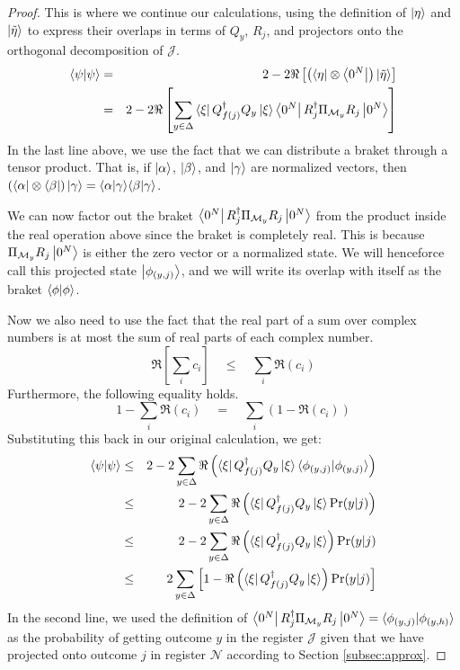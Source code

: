 \begin{proof}
This is where we continue our calculations, using the definition of $\left\vert{\eta}\right\rangle$
and $\left\vert{\tilde{\eta}}\right\rangle$ to express their overlaps in terms of $Q_y$,
$R_j$, and projectors onto the orthogonal decomposition of $\mathcal{J}$.
%
\begin{eqnarray}
\langle \psi|\psi \rangle & = & 2 - 2\Re\left[ \left(\left\langle{\eta}\right\vert \otimes \left\langle{0^N}\right\vert\right) \left\vert{\tilde{\eta}}\right\rangle \right] \\
                    & = & 2 - 2\Re\left[ \sum_{y \in \Delta} \left\langle{\xi}\right\vert Q_{f(j)}^{\dagger}Q_y \left\vert{\xi}\right\rangle
                                                             \left\langle{0^N}\right\vert R_j^{\dagger}\Pi_{\mathcal{M}_y}R_j\left\vert{0^N}\right\rangle \right] \label{eqn:sym-real}
\end{eqnarray}
%
In the last line above, we use the fact that we can distribute a braket
through a tensor product. That is, if $\left\vert{\alpha}\right\rangle$, $\left\vert{\beta}\right\rangle$, and
$\left\vert{\gamma}\right\rangle$ are normalized vectors, then
$\left( \left\langle{\alpha}\right\vert \otimes \left\langle{\beta}\right\vert\right) \left\vert{\gamma}\right\rangle = 
 \langle \alpha|\gamma \rangle\langle \beta|\gamma \rangle$.
 
We can now factor out the braket
$\left\langle{0^N}\right\vert R_j^{\dagger}\Pi_{\mathcal{M}_y}R_j\left\vert{0^N}\right\rangle$ from the product
inside the real operation above since the braket is completely real. This is
because $\Pi_{\mathcal{M}_y}R_j \left\vert{0^N}\right\rangle$ is either the zero vector or
a normalized state. We will henceforce call this projected state
$\left\vert{\phi_{(y,j)}}\right\rangle$, and we will write its overlap with itself
as the braket $\langle \phi|\phi \rangle$.

Now we also need to use the fact that the real part of a sum over complex
numbers is at most the sum of real parts of each complex number.
%
\begin{equation}
\Re\left[ \sum_{i} c_i \right] \quad \le \quad \sum_{i} \Re( c_i )
\end{equation}
%
Furthermore, the following equality holds.
%
\begin{equation}
1 - \sum_{i} \Re(c_i) \quad = \quad \sum_{i} \left(1 - \Re(c_i) \right)
\end{equation}
%
Substituting this
back in our original calculation, we get:
%
\begin{eqnarray}
\langle \psi|\psi \rangle & \le & 2 - 2\sum_{y \in \Delta} \Re\left(
  \left\langle{\xi}\right\vert Q_{f(j)}^{\dagger}Q_y \left\vert{\xi}\right\rangle
  \langle \phi_{(y,j)}|\phi_{(y,j)} \rangle \right) \\
   & \le & 2 - 2\sum_{y \in \Delta} \Re\left(
           \left\langle{\xi}\right\vert Q_{f(j)}^{\dagger}Q_y \left\vert{\xi}\right\rangle\Pr(y | j) \right) \\
   & \le & 2 - 2\sum_{y \in \Delta} \Re\left(
           \left\langle{\xi}\right\vert Q_{f(j)}^{\dagger}Q_y \left\vert{\xi}\right\rangle\right) \Pr(y | j) \\
   & \le & 2 \sum_{y \in \Delta}\left[
           1 - \Re\left( \left\langle{\xi}\right\vert Q_{f(j)}^{\dagger}Q_y \left\vert{\xi}\right\rangle \right)
           \Pr(y | j)
           \right]
\end{eqnarray}
%
In the second line, we used the definition of
$\left\langle{0^N}\right\vert R_j^{\dagger}\Pi_{\mathcal{M}_y}R_j\left\vert{0^N}\right\rangle = \langle \phi_{(y,j)}|\phi_{(y,h)} \rangle$
as the probability of getting outcome $y$ in the register
$\mathcal{J}$ given that we have projected onto outcome $j$ in register
$\mathcal{N}$ according to Section \ref{subsec:approx}.


\end{proof}
